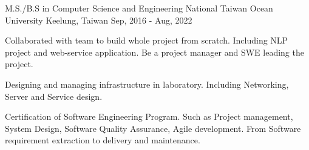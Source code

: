 

\begin{cventries}

  \cventry
    {M.S./B.S in Computer Science and Engineering} %
    {National Taiwan Ocean University} %
    {Keelung, Taiwan} %
    {Sep, 2016 - Aug, 2022} %
    {
      \begin{cvitems} %
        \item {Collaborated with team to build whole project from scratch. Including NLP project and web-service application. Be a project manager and SWE leading the project.}
        \item {Designing and managing infrastructure in laboratory. Including Networking, Server and Service design.}
        \item {Certification of Software Engineering Program. Such as Project management, System Design, Software Quality Assurance, Agile development. From Software requirement extraction to delivery and maintenance.}
      \end{cvitems}
    }


\end{cventries}
